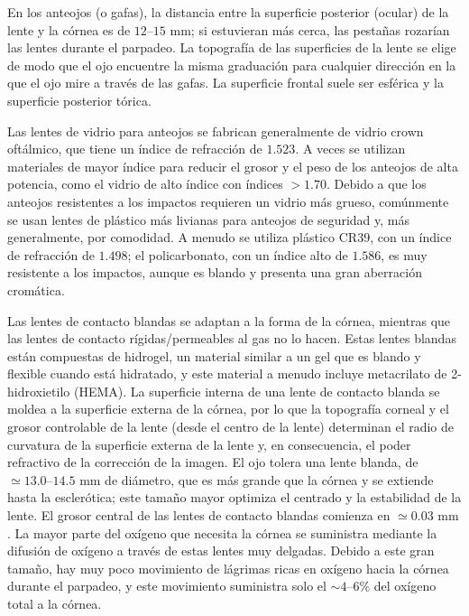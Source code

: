 \documentclass[12pt]{book}
\begin{document}
En los anteojos (o gafas), la distancia entre la superficie posterior (ocular) de la lente y la córnea es de $12\text{--}15\text{ mm}$; si estuvieran más cerca, las pestañas rozarían las lentes durante el parpadeo. La topografía de las superficies de la lente se elige de modo que el ojo encuentre la misma graduación para cualquier dirección en la que el ojo mire a través de las gafas. La superficie frontal suele ser esférica y la superficie posterior tórica.

Las lentes de vidrio para anteojos se fabrican generalmente de vidrio crown oftálmico, que tiene un índice de refracción de $1.523$. A veces se utilizan materiales de mayor índice para reducir el grosor y el peso de los anteojos de alta potencia, como el vidrio de alto índice con índices $>1.70$. Debido a que los anteojos resistentes a los impactos requieren un vidrio más grueso, comúnmente se usan lentes de plástico más livianas para anteojos de seguridad y, más generalmente, por comodidad. A menudo se utiliza plástico CR39, con un índice de refracción de $1.498$; el policarbonato, con un índice alto de $1.586$, es muy resistente a los impactos, aunque es blando y presenta una gran aberración cromática.

Las lentes de contacto blandas se adaptan a la forma de la córnea, mientras que las lentes de contacto rígidas/permeables al gas no lo hacen. Estas lentes blandas están compuestas de hidrogel, un material similar a un gel que es blando y flexible cuando está hidratado, y este material a menudo incluye metacrilato de 2-hidroxietilo (HEMA). La superficie interna de una lente de contacto blanda se moldea a la superficie externa de la córnea, por lo que la topografía corneal y el grosor controlable de la lente (desde el centro de la lente) determinan el radio de curvatura de la superficie externa de la lente y, en consecuencia, el poder refractivo de la corrección de la imagen. El ojo tolera una lente blanda, de $\simeq 13.0\text{--}14.5\text{ mm}$ de diámetro, que es más grande que la córnea y se extiende hasta la esclerótica; este tamaño mayor optimiza el centrado y la estabilidad de la lente. El grosor central de las lentes de contacto blandas comienza en $\simeq 0.03\text{ mm}$. La mayor parte del oxígeno que necesita la córnea se suministra mediante la difusión de oxígeno a través de estas lentes muy delgadas. Debido a este gran tamaño, hay muy poco movimiento de lágrimas ricas en oxígeno hacia la córnea durante el parpadeo, y este movimiento suministra solo el $\sim 4\text{--}6\%$ del oxígeno total a la córnea.
\end{document}
